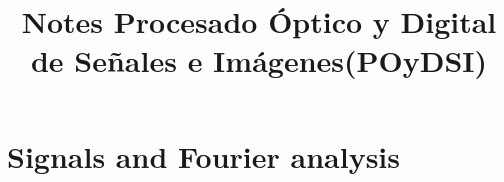 \documentclass{book}
\newcommand\Course{Procesado Óptico y Digital de Señales e Imágenes}
\newcommand\CourseShortName{POyDSI}
\begin{document}
\title{Notes \Course (\CourseShortName)}

\maketitle


\dominitoc %
\tableofcontents


\chapter{Signals and Fourier analysis}
\minitoc


\end{document}
